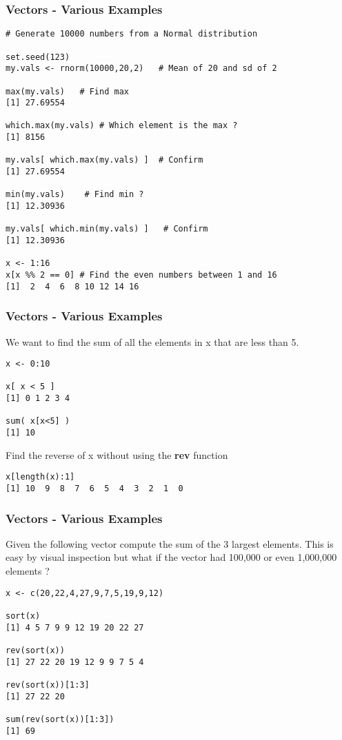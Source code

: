 \documentclass{beamer}
\begin{document}

\begin{frame}[fragile]
\frametitle{Vectors - Various Examples}
\scriptsize
\begin{verbatim}
# Generate 10000 numbers from a Normal distribution

set.seed(123)
my.vals <- rnorm(10000,20,2)   # Mean of 20 and sd of 2
 
max(my.vals)   # Find max 
[1] 27.69554

which.max(my.vals) # Which element is the max ? 
[1] 8156

my.vals[ which.max(my.vals) ]  # Confirm
[1] 27.69554

min(my.vals)    # Find min ?
[1] 12.30936

my.vals[ which.min(my.vals) ]   # Confirm
[1] 12.30936
 
x <- 1:16
x[x %% 2 == 0] # Find the even numbers between 1 and 16
[1]  2  4  6  8 10 12 14 16
\end{verbatim}
\end{frame}

% 

\begin{frame}[fragile]
\frametitle{Vectors - Various Examples}
We want to find the sum of all the elements in x that are less than 5.
\footnotesize
\begin{verbatim}
x <- 0:10

x[ x < 5 ]
[1] 0 1 2 3 4

sum( x[x<5] )
[1] 10
\end{verbatim}
\normalsize
Find the reverse of x without using the \textbf{rev} function
\footnotesize
\begin{verbatim}
x[length(x):1]
[1] 10  9  8  7  6  5  4  3  2  1  0
\end{verbatim}
\end{frame}

%
\begin{frame}[fragile]
\frametitle{Vectors - Various Examples}
Given the following vector compute the sum of the 3 largest elements. This is easy
 by visual inspection but what if the vector had 100,000 or even 1,000,000 elements ?
\small
\begin{verbatim}
x <- c(20,22,4,27,9,7,5,19,9,12)

sort(x)
[1] 4 5 7 9 9 12 19 20 22 27

rev(sort(x))
[1] 27 22 20 19 12 9 9 7 5 4

rev(sort(x))[1:3]
[1] 27 22 20

sum(rev(sort(x))[1:3])
[1] 69
\end{verbatim}
\end{frame}
\end{document}
